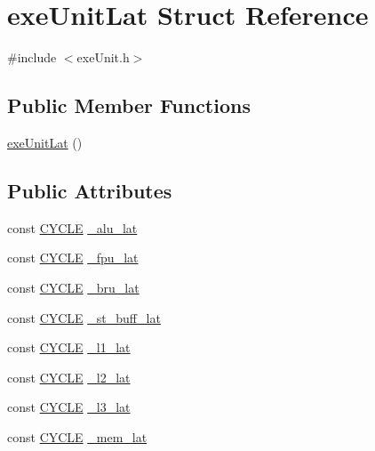 \hypertarget{structexeUnitLat}{
\section{exeUnitLat Struct Reference}
\label{structexeUnitLat}
}


{\ttfamily \#include $<$exeUnit.h$>$}

\subsection*{Public Member Functions}
\begin{DoxyCompactItemize}
\item 
\hyperlink{structexeUnitLat_acd7bea2d80b4acddfd631aaca75fa8b5}{exeUnitLat} ()
\end{DoxyCompactItemize}
\subsection*{Public Attributes}
\begin{DoxyCompactItemize}
\item 
const \hyperlink{global_2global_8h_a7e19a550ec11d1ed921deb20c22efb5b}{CYCLE} \hyperlink{structexeUnitLat_a1c6fbd51db44097cab33015d4ee9dd81}{\_\-alu\_\-lat}
\item 
const \hyperlink{global_2global_8h_a7e19a550ec11d1ed921deb20c22efb5b}{CYCLE} \hyperlink{structexeUnitLat_a3eaf6d977e10668f9f9641601c2e155d}{\_\-fpu\_\-lat}
\item 
const \hyperlink{global_2global_8h_a7e19a550ec11d1ed921deb20c22efb5b}{CYCLE} \hyperlink{structexeUnitLat_a56f987ed90a23321279e330e068262f8}{\_\-bru\_\-lat}
\item 
const \hyperlink{global_2global_8h_a7e19a550ec11d1ed921deb20c22efb5b}{CYCLE} \hyperlink{structexeUnitLat_a2e0a0b29c7d4cd40492fe25740302c72}{\_\-st\_\-buff\_\-lat}
\item 
const \hyperlink{global_2global_8h_a7e19a550ec11d1ed921deb20c22efb5b}{CYCLE} \hyperlink{structexeUnitLat_a3c5ce17975afa47ae136e8355e328c3b}{\_\-l1\_\-lat}
\item 
const \hyperlink{global_2global_8h_a7e19a550ec11d1ed921deb20c22efb5b}{CYCLE} \hyperlink{structexeUnitLat_a0a5e96d306ef23a2d69c8e97d62b27fd}{\_\-l2\_\-lat}
\item 
const \hyperlink{global_2global_8h_a7e19a550ec11d1ed921deb20c22efb5b}{CYCLE} \hyperlink{structexeUnitLat_ae34f390b9e9b8e9d792a6656b801eca4}{\_\-l3\_\-lat}
\item 
const \hyperlink{global_2global_8h_a7e19a550ec11d1ed921deb20c22efb5b}{CYCLE} \hyperlink{structexeUnitLat_a0478d29cba99e1c3849dceb6ecfca973}{\_\-mem\_\-lat}
\end{DoxyCompactItemize}


